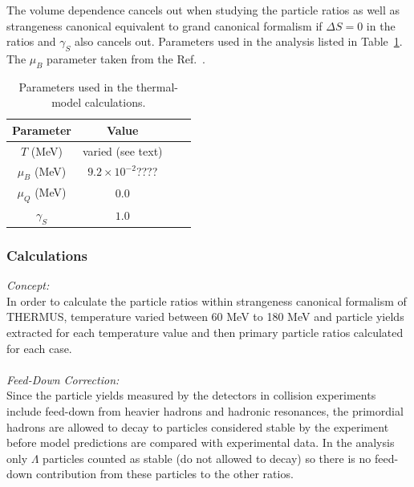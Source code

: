 The volume dependence cancels out when studying the particle ratios as well as strangeness canonical equivalent to grand canonical formalism if $\Delta S=0$ in the ratios and $\gamma_{S}$ also cancels out. Parameters used in the analysis listed in Table~\ref{jfonts}. The $\mu_{B}$ parameter taken from the Ref.~\cite{Cleymans:2011pe}.
 
 \begin{center}
\begin{table}[h]
\centering
\caption{\label{jfonts} Parameters used in the thermal-model calculations.} 
 \begin{tabular}{@{}*{2}{cc}}
\hline
Parameter&Value\\
\hline
$T$ (MeV)&varied (see text)\\
$\mu_{B}$ (MeV)&$9.2\times10^{-2}$????\\ 
$\mu_{Q}$ (MeV)&$0.0$\\ 
$\gamma_{S}$&$1.0$\\ 
\hline
\end{tabular}
\end{table}
\end{center}
\newpage
\subsubsection{Calculations}
\textit{Concept:} \\In order to calculate the particle ratios within strangeness canonical formalism of THERMUS, temperature varied between 60 MeV to 180 MeV and particle yields extracted for each temperature value and then primary particle ratios calculated for each case. \\ \\
\textit{Feed-Down Correction:} \\Since the particle yields measured by the detectors in collision experiments include feed-down from heavier hadrons and hadronic resonances, the primordial hadrons are allowed to decay to particles considered stable by the experiment before model predictions are compared with experimental data. In the analysis only  $\Lambda$ particles counted as stable (do not allowed to decay) so there is no feed-down contribution from these particles to the other ratios.  \\ \\


